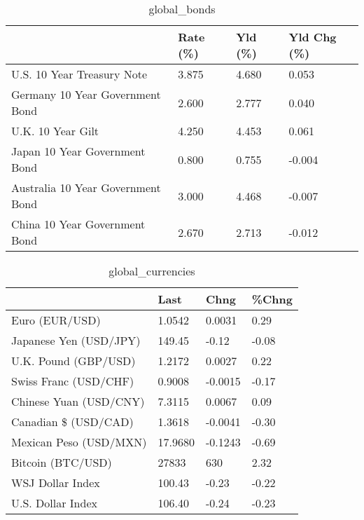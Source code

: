 \documentclass{article}%
\begin{document}
%


\begin{table}[htbp]%
\caption{global\_bonds}%
\centering%
\begin{adjustbox}{width=1\textwidth}%
\begin{tabular}{llll}
\toprule
                                  & Rate (\%) & Yld (\%) & Yld Chg (\%) \\
\midrule
       U.S. 10 Year Treasury Note &    3.875 &   4.680 &       0.053 \\
  Germany 10 Year Government Bond &    2.600 &   2.777 &       0.040 \\
                U.K. 10 Year Gilt &    4.250 &   4.453 &       0.061 \\
    Japan 10 Year Government Bond &    0.800 &   0.755 &      -0.004 \\
Australia 10 Year Government Bond &    3.000 &   4.468 &      -0.007 \\
    China 10 Year Government Bond &    2.670 &   2.713 &      -0.012 \\
\bottomrule
\end{tabular}
%
\end{adjustbox}%
\end{table}

%


\begin{table}[htbp]%
\caption{global\_currencies}%
\centering%
\begin{adjustbox}{width=1\textwidth}%
\begin{tabular}{llll}
\toprule
                       &    Last &    Chng & \%Chng \\
\midrule
        Euro (EUR/USD) &  1.0542 &  0.0031 &  0.29 \\
Japanese Yen (USD/JPY) &  149.45 &   -0.12 & -0.08 \\
  U.K. Pound (GBP/USD) &  1.2172 &  0.0027 &  0.22 \\
 Swiss Franc (USD/CHF) &  0.9008 & -0.0015 & -0.17 \\
Chinese Yuan (USD/CNY) &  7.3115 &  0.0067 &  0.09 \\
  Canadian \$ (USD/CAD) &  1.3618 & -0.0041 & -0.30 \\
Mexican Peso (USD/MXN) & 17.9680 & -0.1243 & -0.69 \\
     Bitcoin (BTC/USD) &   27833 &     630 &  2.32 \\
      WSJ Dollar Index &  100.43 &   -0.23 & -0.22 \\
     U.S. Dollar Index &  106.40 &   -0.24 & -0.23 \\
\bottomrule
\end{tabular}
%
\end{adjustbox}%
\end{table}
\end{document}

